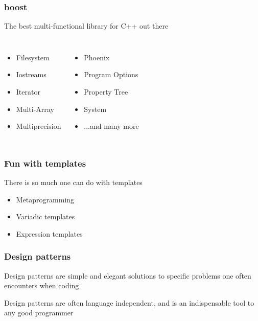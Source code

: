 \documentclass[14pt,a4paper,dvipsnames,usenames]{beamer}
\begin{document}
\begin{frame}[fragile]
  \frametitle{boost}

  The best multi-functional library for C++ out there

  \vspace{.5em}
  \begin{columns}
  \begin{itemize}
    \setlength\itemsep{.5em}
    \item Filesystem
    \item Iostreams
    \item Iterator
    \item Multi-Array
    \item Multiprecision
  \end{itemize}
  \begin{itemize}
    \setlength\itemsep{.5em}
    \item Phoenix
    \item Program Options
    \item Property Tree
    \item System
    \item ...and many more
  \end{itemize}
  \end{columns}
  
\end{frame}

\begin{frame}[fragile]
  \frametitle{Fun with templates}

  There is so much one can do with templates

  \vspace{.5em}
  \begin{itemize}
    \setlength\itemsep{.75em}
    \item Metaprogramming
    \item Variadic templates
    \item Expression templates
  \end{itemize}
  
\end{frame}

\begin{frame}[fragile]
  \frametitle{Design patterns}

  Design patterns are simple and elegant solutions to specific problems
  one often encounters when coding

  \vspace{1cm}
  Design patterns are often language independent, and is an
  indispensable tool to any good programmer
  
\end{frame}
\end{document}
